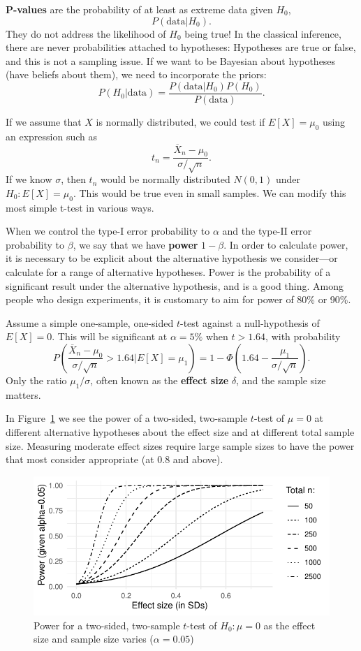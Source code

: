\documentclass[twoside]{article}
\begin{document}
\textbf{P-values} are the probability of at least as extreme data given $H_0$,
\[ P( \text{data}| H_0).\]
They do not address the likelihood of $H_0$ being true!
In the classical inference, there are never probabilities attached to hypotheses: Hypotheses are true 
or false, and this is not a sampling issue.
If we want to be Bayesian about hypotheses (have beliefs about them), we need to incorporate the priors: 
\[ P(H_0|\text{data}) = \frac{ P(\text{data}|H_0) P(H_0)}{ P(\text{data}) }.
\]

If we assume that $X$ is normally distributed, we could 
test if $E[X] = \mu_0$ using an expression such as
\[
t_n = \frac{\overline{X}_n - \mu_0}{\sigma/\sqrt{n}}.
\]
If we know $\sigma$, then $t_n$ would be normally distributed $N(0,1)$ under $H_0: E[X]=\mu_0$. 
This would be true even in small samples.
We can modify this most simple t-test in various ways.


When we control the type-I error probability to $\alpha$ and the type-II error probability
to $\beta$, we say that we have \textbf{power} $1-\beta$. 
In order to calculate power, it is necessary to be explicit about the alternative hypothesis 
we consider---or calculate for a range of alternative hypotheses. 
Power is the probability of a significant result under the alternative hypothesis, and is a good thing. 
Among people who design experiments, it is customary to aim for power of 80\% or 90\%.

Assume a simple one-sample, one-sided $t$-test against a null-hypothesis of $E[X]=0$. This will
be significant at $\alpha=5\%$ when $t> 1.64$, with probability
\[
P\left( \frac{\overline{X}_n - \mu_0}{\sigma/\sqrt{n}} > 1.64 | E[X]=\mu_1\right) = 
1 - \Phi\left( 1.64 - \frac{\mu_1}{\sigma/\sqrt{n}}\right).
\]
Only the ratio $\mu_1/\sigma$, often known as the \textbf{effect size}  $\delta$, and the sample
size matters.

In Figure~\ref{fig:power} we see the power of a two-sided, two-sample $t$-test
of $\mu=0$ at different alternative hypotheses about the effect size and at
different total sample size. Measuring moderate effect sizes require large sample
sizes to have the power that most consider appropriate (at 0.8 and above). 

\begin{figure}[tb]
\includegraphics[width=\textwidth]{../graphs/powergraph}

\caption{Power for a two-sided, two-sample $t$-test of $H_0: \mu=0$ as the effect 
size and sample size varies ($\alpha=0.05$)}\label{fig:power}
\end{figure}
\end{document}
